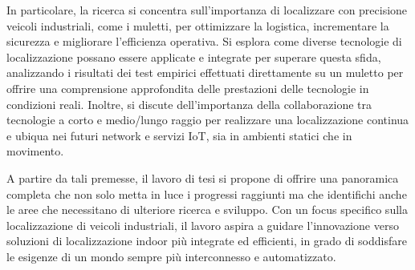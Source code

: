 \noindent In particolare, la ricerca si concentra sull'importanza di localizzare con precisione veicoli industriali, come i muletti, per ottimizzare la logistica, incrementare la sicurezza e migliorare l'efficienza operativa. Si esplora come diverse tecnologie di localizzazione possano essere applicate e integrate per superare questa sfida, analizzando i risultati dei test empirici effettuati direttamente su un muletto per offrire una comprensione approfondita delle prestazioni delle tecnologie in condizioni reali. Inoltre, si discute dell'importanza della collaborazione tra tecnologie a corto e medio/lungo raggio per realizzare una localizzazione continua e ubiqua nei futuri network e servizi IoT, sia in ambienti statici che in movimento. 

A partire da tali premesse, il lavoro di tesi si propone di offrire una panoramica completa che non solo metta in luce i progressi raggiunti ma che identifichi anche le aree che necessitano di ulteriore ricerca e sviluppo. Con un focus specifico sulla localizzazione di veicoli industriali, il lavoro aspira a guidare l'innovazione verso soluzioni di localizzazione indoor più integrate ed efficienti, in grado di soddisfare le esigenze di un mondo sempre più interconnesso e automatizzato.
